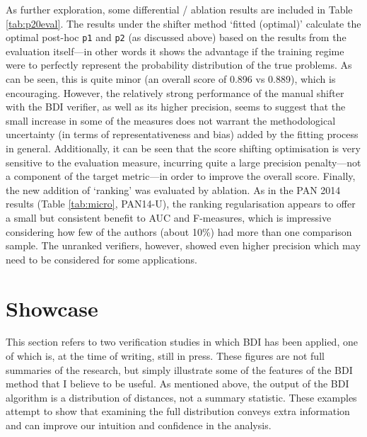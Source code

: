 \documentclass[
    hf
]{ceurart}
\begin{document}
As further exploration, some differential / ablation results are included in Table
\ref{tab:p20eval}. The results under the shifter method `fitted (optimal)' calculate the optimal
post-hoc \texttt{p1} and \texttt{p2} (as discussed above) based on the results from the evaluation
itself---in other words it shows the advantage if the training regime were to perfectly represent
the probability distribution of the true problems. As can be seen, this is quite minor (an overall
score of 0.896 vs 0.889), which is encouraging. However, the relatively strong performance of the
manual shifter with the BDI verifier, as well as its higher precision, seems to suggest that the
small increase in some of the measures does not warrant the methodological uncertainty (in terms of
representativeness and bias) added by the fitting process in general. Additionally, it can be seen
that the score shifting optimisation is very sensitive to the evaluation measure, incurring quite a
large precision penalty---not a component of the target metric---in order to improve the overall
score. Finally, the new addition of `ranking' was evaluated by ablation. As in the PAN 2014 results
(Table \ref{tab:micro}, PAN14-U), the ranking regularisation appears to offer a small but consistent
benefit to AUC and F-measures, which is impressive considering how few of the authors (about 10\%)
had more than one comparison sample. The unranked verifiers, however, showed even higher precision
which may need to be considered for some applications.

\section{Showcase}\label{sec:showcase}

This section refers to two verification studies in which BDI has been applied, one of which is, at
the time of writing, still in press. These figures are not full summaries of the research, but
simply illustrate some of the features of the BDI method that I believe to be useful. As mentioned
above, the output of the BDI algorithm is a distribution of distances, not a summary statistic.
These examples attempt to show that examining the full distribution conveys extra information and
can improve our intuition and confidence in the analysis.
\end{document}
